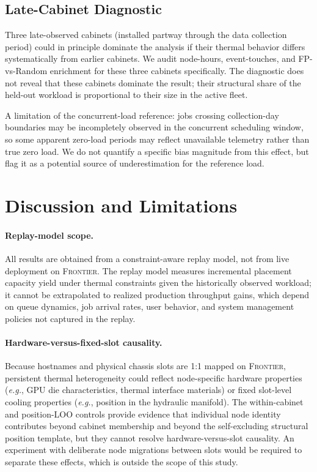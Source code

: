 \documentclass[acmsmall,screen,review,anonymous]{acmart}
\newcommand{\Frontier}{\textsc{Frontier}\xspace}
\newcommand{\eg}{\textit{e.g.},\xspace}
\begin{document}
\subsection{Late-Cabinet Diagnostic}

Three late-observed cabinets (installed partway through the data collection period)
could in principle dominate the analysis if their thermal behavior differs systematically
from earlier cabinets.  We audit node-hours, event-touches, and FP-vs-Random enrichment
for these three cabinets specifically.  The diagnostic does not reveal that these cabinets
dominate the result; their structural share of the held-out workload is proportional to
their size in the active fleet.

A limitation of the concurrent-load reference: jobs crossing collection-day boundaries
may be incompletely observed in the concurrent scheduling window, so some apparent
zero-load periods may reflect unavailable telemetry rather than true zero load.  We do
not quantify a specific bias magnitude from this effect, but flag it as a potential
source of underestimation for the reference load.

\section{Discussion and Limitations}
\label{sec:discussion}

\paragraph{Replay-model scope.}
All results are obtained from a constraint-aware replay model, not from live deployment
on \Frontier.  The replay model measures incremental placement capacity yield under
thermal constraints given the historically observed workload; it cannot be extrapolated
to realized production throughput gains, which depend on queue dynamics, job arrival
rates, user behavior, and system management policies not captured in the replay.

\paragraph{Hardware-versus-fixed-slot causality.}
Because hostnames and physical chassis slots are 1:1 mapped on \Frontier, persistent
thermal heterogeneity could reflect node-specific hardware properties (\eg GPU die
characteristics, thermal interface materials) or fixed slot-level cooling properties
(\eg position in the hydraulic manifold).  The within-cabinet and position-LOO controls
provide evidence that individual node identity contributes beyond cabinet membership and
beyond the self-excluding structural position template, but they cannot resolve
hardware-versus-slot causality.  An experiment with deliberate node migrations between
slots would be required to separate these effects, which is outside the scope of this
study.
\end{document}
